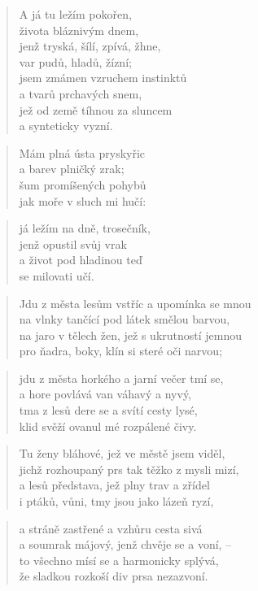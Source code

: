 \documentclass{book}
\begin{document}
\begin{verse}
A já tu ležím pokořen,\\
života bláznivým dnem,\\
jenž tryská, šílí, zpívá, žhne,\\
var pudů, hladů, žízní;\\
jsem zmámen vzruchem instinktů\\
a tvarů prchavých snem,\\
jež od země tíhnou za sluncem\\
a synteticky vyzní.
\end{verse}
\begin{verse}
Mám plná ústa pryskyřic\\
a barev plničký zrak;\\
šum promíšených pohybů\\
jak moře v sluch mi hučí:
\end{verse}
\begin{verse}
já ležím na dně, trosečník,\\
jenž opustil svůj vrak\\
a život pod hladinou teď\\
se milovati učí.
\end{verse}
\newpage
{}
\begin{verse}
Jdu z města lesům vstříc a upomínka se mnou\\
na vlnky tančící pod látek smělou barvou,\\
na jaro v tělech žen, jež s ukrutností jemnou\\
pro ňadra, boky, klín si steré oči narvou;
\end{verse}
\begin{verse}
jdu z města horkého a jarní večer tmí se,\\
a hore povlává van váhavý a nyvý,\\
tma z lesů dere se a svítí cesty lysé,\\
klid svěží ovanul mé rozpálené čivy.
\end{verse}
\begin{verse}
Tu ženy bláhové, jež ve městě jsem viděl,\\
jichž rozhoupaný prs tak těžko z mysli mizí,\\
a lesů představa, jež plny trav a zřídel\\
i ptáků, vůni, tmy jsou jako lázeň ryzí,
\end{verse}
\begin{verse}
a stráně zastřené a vzhůru cesta sivá\\
a soumrak májový, jenž chvěje se a voní, --\\
to všechno mísí se a harmonicky splývá,\\
že sladkou rozkoší div prsa nezazvoní.
\end{verse}
\end{document}
